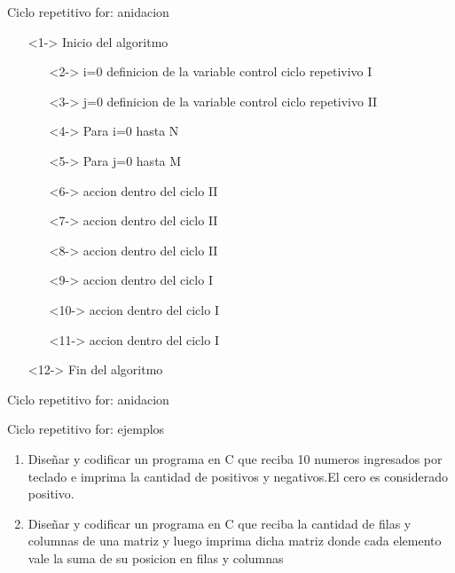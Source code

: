 \documentclass[xcolor=pdftex,table,11pt]{beamer}
\begin{document}
\begin{frame}{Ciclo repetitivo for: anidacion}
\begin{itemize}
   \item[]<1-> Inicio del algoritmo

   \begin{itemize}
   		\item[]<2-> i=0 definicion de la variable control ciclo repetivivo I
   		\item[]<3-> j=0 definicion de la variable control ciclo repetivivo II
     	\item[]<4-> Para i=0 hasta N
     		\item[]<5-> \hspace{0.3in} Para j=0 hasta M
     		\item[]<6->  \hspace{0.5in} accion dentro del ciclo II
         	\item[]<7->  \hspace{0.5in} accion dentro del ciclo II
			\item[]<8->  \hspace{0.5in} accion dentro del ciclo II
   
   \item[]<9->  \hspace{0.3in}  accion dentro del ciclo I
   \item[]<10->  \hspace{0.3in}  accion dentro del ciclo I
   \item[]<11->  \hspace{0.3in}  accion dentro del ciclo I
   \end{itemize}
  \item[]<12-> Fin del algoritmo\end{itemize}
\end{frame}


\begin{frame}{Ciclo repetitivo for: anidacion}
\codesetstylefrombeamer
{}
\end{frame}




\begin{frame}{Ciclo repetitivo for: ejemplos}
 \begin{enumerate}
   
  \item Diseñar y codificar un programa en C que reciba 10 numeros ingresados por teclado e imprima la cantidad de positivos y negativos.El cero es considerado positivo.
\href{https://github.com/danis963/informaticaI_IUA/blob/main/c/src/3-2-for.c}{}


  \item Diseñar y codificar un programa en C que reciba
la cantidad de filas y columnas de una matriz y luego imprima 
dicha matriz donde cada elemento vale la suma de su posicion en filas y columnas
\href{https://github.com/danis963/informaticaI_IUA/blob/main/c/src/3-5-for.c}{}

   \end{enumerate}
   

\end{frame}
\end{document}
